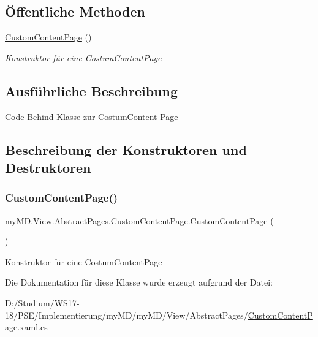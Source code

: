 \subsection*{Öffentliche Methoden}
\begin{DoxyCompactItemize}
\item 
\mbox{\hyperlink{classmy_m_d_1_1_view_1_1_abstract_pages_1_1_custom_content_page_a3cb9c69e49e16c30e2e5377790702769}{Custom\+Content\+Page}} ()
\begin{DoxyCompactList}\small\item\em Konstruktor für eine Costum\+Content\+Page \end{DoxyCompactList}\end{DoxyCompactItemize}


\subsection{Ausführliche Beschreibung}
Code-\/\+Behind Klasse zur Costum\+Content Page 



\subsection{Beschreibung der Konstruktoren und Destruktoren}
\mbox{\label{classmy_m_d_1_1_view_1_1_abstract_pages_1_1_custom_content_page_a3cb9c69e49e16c30e2e5377790702769}} 
\subsubsection{\texorpdfstring{Custom\+Content\+Page()}{CustomContentPage()}}
{\footnotesize\ttfamily my\+M\+D.\+View.\+Abstract\+Pages.\+Custom\+Content\+Page.\+Custom\+Content\+Page (\begin{DoxyParamCaption}{ }\end{DoxyParamCaption})}



Konstruktor für eine Costum\+Content\+Page 



Die Dokumentation für diese Klasse wurde erzeugt aufgrund der Datei\+:\begin{DoxyCompactItemize}
\item 
D\+:/\+Studium/\+W\+S17-\/18/\+P\+S\+E/\+Implementierung/my\+M\+D/my\+M\+D/\+View/\+Abstract\+Pages/\mbox{\hyperlink{_custom_content_page_8xaml_8cs}{Custom\+Content\+Page.\+xaml.\+cs}}\end{DoxyCompactItemize}
